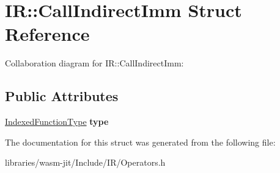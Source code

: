 \hypertarget{struct_i_r_1_1_call_indirect_imm}{}\section{IR\+:\+:Call\+Indirect\+Imm Struct Reference}
\label{struct_i_r_1_1_call_indirect_imm}


Collaboration diagram for IR\+:\+:Call\+Indirect\+Imm\+:
\subsection*{Public Attributes}
\begin{DoxyCompactItemize}
\item 
\mbox{\label{struct_i_r_1_1_call_indirect_imm_ad5e749796116ddbe5569617b53396415}} 
\mbox{\hyperlink{struct_i_r_1_1_indexed_function_type}{Indexed\+Function\+Type}} {\bfseries type}
\end{DoxyCompactItemize}


The documentation for this struct was generated from the following file\+:\begin{DoxyCompactItemize}
\item 
libraries/wasm-\/jit/\+Include/\+I\+R/Operators.\+h\end{DoxyCompactItemize}
